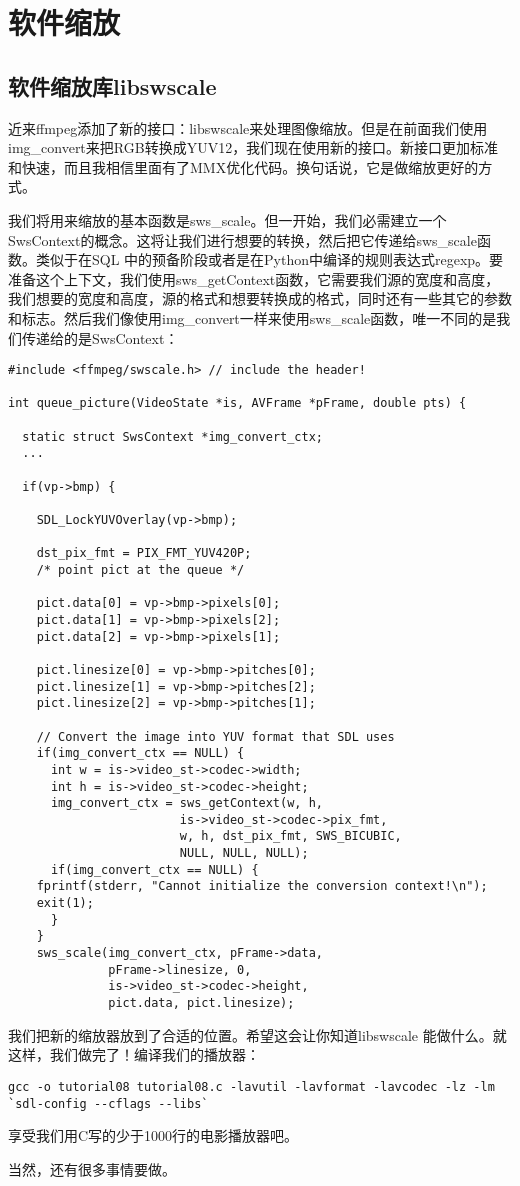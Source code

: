 ﻿\chapter{软件缩放}
\label{ch8}
\section{软件缩放库libswscale}
近来ffmpeg添加了新的接口：libswscale来处理图像缩放。但是在前面我们使用img_convert来把RGB转换成YUV12，我们现在使用新的接口。新接口更加标准和快速，而且我相信里面有了MMX优化代码。换句话说，它是做缩放更好的方式。

我们将用来缩放的基本函数是sws_scale。但一开始，我们必需建立一个SwsContext的概念。这将让我们进行想要的转换，然后把它传递给sws_scale函数。类似于在SQL 中的预备阶段或者是在Python中编译的规则表达式regexp。要准备这个上下文，我们使用sws_getContext函数，它需要我们源的宽度和高度，我们想要的宽度和高度，源的格式和想要转换成的格式，同时还有一些其它的参数和标志。然后我们像使用img_convert一样来使用sws_scale函数，唯一不同的是我们传递给的是SwsContext：
\begin{lstlisting}
#include <ffmpeg/swscale.h> // include the header!

int queue_picture(VideoState *is, AVFrame *pFrame, double pts) {

  static struct SwsContext *img_convert_ctx;
  ...

  if(vp->bmp) {

    SDL_LockYUVOverlay(vp->bmp);

    dst_pix_fmt = PIX_FMT_YUV420P;
    /* point pict at the queue */

    pict.data[0] = vp->bmp->pixels[0];
    pict.data[1] = vp->bmp->pixels[2];
    pict.data[2] = vp->bmp->pixels[1];

    pict.linesize[0] = vp->bmp->pitches[0];
    pict.linesize[1] = vp->bmp->pitches[2];
    pict.linesize[2] = vp->bmp->pitches[1];

    // Convert the image into YUV format that SDL uses
    if(img_convert_ctx == NULL) {
      int w = is->video_st->codec->width;
      int h = is->video_st->codec->height;
      img_convert_ctx = sws_getContext(w, h,
                        is->video_st->codec->pix_fmt,
                        w, h, dst_pix_fmt, SWS_BICUBIC,
                        NULL, NULL, NULL);
      if(img_convert_ctx == NULL) {
    fprintf(stderr, "Cannot initialize the conversion context!\n");
    exit(1);
      }
    }
    sws_scale(img_convert_ctx, pFrame->data,
              pFrame->linesize, 0,
              is->video_st->codec->height,
              pict.data, pict.linesize);
\end{lstlisting}

我们把新的缩放器放到了合适的位置。希望这会让你知道libswscale 能做什么。就这样，我们做完了！编译我们的播放器：
\begin{lstlisting}
gcc -o tutorial08 tutorial08.c -lavutil -lavformat -lavcodec -lz -lm `sdl-config --cflags --libs`
\end{lstlisting}
享受我们用C写的少于1000行的电影播放器吧。

当然，还有很多事情要做。
